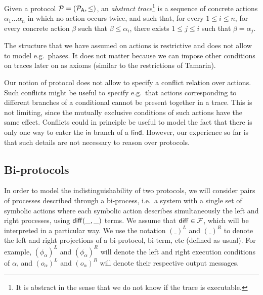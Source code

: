 \begin{definition}
  \label{def:trace}
  Given a protocol $\mathcal{P} = (\mathcal{P}_{\textsf{A}}, \leq)$,
  an \emph{abstract trace}\footnote{
    It is abstract in the sense that we do not know if the trace
    is executable. } is a sequence of concrete actions
  $\alpha_1 \dots \alpha_n$
  in which no action occurs twice, and such that,
  for every $1 \leq i \leq n$,
  for every concrete action $\beta$ such that $\beta \leq \alpha_i$,
  there exists $1 \leq j \leq i$ such that $\beta = \alpha_j$.
\end{definition}

\begin{remark}
  The structure that we have assumed on actions is restrictive and
  does not allow to model e.g.\ phases. It does not matter because we can
  impose other conditions on traces later on as axioms (similar to the
  restrictions of Tamarin).
\end{remark}

\begin{remark}
  Our notion of protocol does not allow to specify a conflict relation
  over actions. Such conflicts might be useful to specify e.g.\ that
  actions corresponding to different branches of a conditional cannot
  be present together in a trace. This is not limiting, since the
  mutually exclusive conditions of such actions have the same effect.
  Conflicts could in principle be useful to model the fact that there is only
  one way to enter the $\mathsf{in}$ branch of a $\mathsf{find}$. However,
  our experience so far is that such details are not necessary to reason
  over protocols. 
\end{remark}

\subsection{Bi-protocols}

In order to model the indistinguishability of two protocols, we will
consider pairs of processes described through a bi-process, i.e.\ a system with
a single set of symbolic actions where each symbolic action describes
simultaneously the left and right processes, using $\mathsf{diff}(\_,\_)$ terms.
We assume that $\mathsf{diff} \in \mathcal{F}$,
which will be interpreted in a particular way. 
We use the notation $(\_)^L$ and $(\_)^R$ to denote the left and right
projections of a bi-protocol, bi-term, etc (defined as usual).
For example, $(\phi_{\alpha})^L$ and $(\phi_{\alpha})^R$ will denote
the left and right execution conditions of $\alpha$, and
$(o_{\alpha})^L$ and $(o_{\alpha})^R$ will denote their respective
output messages.

